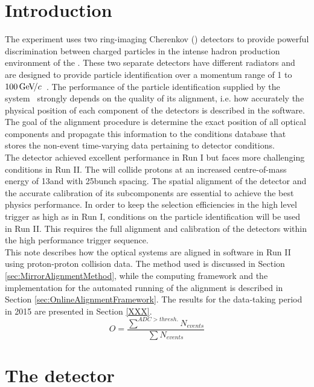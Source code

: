 \section{Introduction}
\label{sec:Introduction}

The \lhcb experiment uses two ring-imaging Cherenkov (\rich) detectors to provide powerful discrimination between charged particles in the intense hadron production environment of the \lhc. These two separate \rich detectors have different radiators and are designed to provide particle identification over a momentum range of 1 to $100{\mathrm{\,Ge\kern -0.1em V\!/}c}$~\cite{Alves:2008zz}. The performance of the particle identification supplied by the \rich system~\cite{LHCb-DP-2012-003} strongly depends on the quality of its alignment, i.e. how accurately the physical position of each component of the \rich detectors is described in the \lhcb software. The goal of the alignment procedure is determine the exact position of all optical components and propagate this information to the \lhcb conditions database that stores the non-event time-varying data pertaining to detector conditions.\\
The \lhcb detector achieved excellent performance in Run I but faces more challenging conditions in Run II. The \lhc will collide protons at an increased centre-of-mass energy of 13\tev and with 25\ns bunch spacing. The spatial alignment of the detector and the accurate calibration of its subcomponents are essential to achieve the best physics performance. In order to keep the selection efficiencies in the high level trigger as high as in Run I, conditions on the particle identification will be used in Run II. This requires the full alignment and calibration of the \rich detectors within the high performance trigger sequence.\\
This note describes how the \lhcb \rich optical systems are aligned in software in Run II using proton-proton collision data. The method used is discussed in
Section \ref{sec:MirrorAlignmentMethod}, while the computing framework and the implementation for the automated running of the alignment is described in Section \ref{sec:OnlineAlignmentFramework}. The results for the data-taking period in 2015 are presented in Section \ref{XXX}.\\

\begin{equation}
O = \frac{\sum^{ADC>thresh.}N_{events}}{\sum N_{events}}
\end{equation}

\section{The \lhcb detector}

